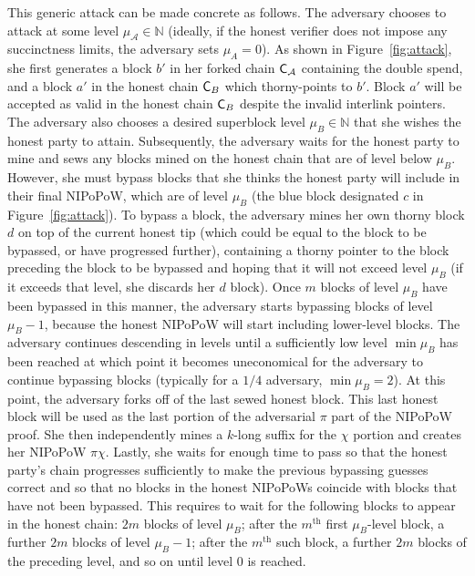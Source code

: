 This generic attack can be made concrete as follows.
The adversary chooses to attack at some level $\mu_\mathcal{A} \in \mathbb{N}$ (ideally, if the honest verifier does not impose any succinctness limits, the adversary sets $\mu_A = 0$). As shown in Figure~\ref{fig:attack}, she first generates a block $b'$ in her forked chain $\mathsf{C}_\mathcal{A}$ containing the double spend, and a block $a'$ in the honest chain $\mathsf{C}_B$ which thorny-points to $b'$. Block $a'$ will be accepted as valid in the honest chain $\mathsf{C}_B$ despite the invalid interlink pointers. The adversary also chooses a desired superblock level $\mu_B \in \mathbb{N}$ that she wishes the honest party to attain. Subsequently, the adversary waits for the honest party to mine and sews any blocks mined on the honest chain that are of level below $\mu_B$. However, she must bypass blocks that she thinks the honest party will include in their final NIPoPoW, which are of level $\mu_B$ (the blue block designated $c$ in Figure~\ref{fig:attack}). To bypass a block, the adversary mines her own thorny block $d$ on top of the current honest tip (which could be equal to the block to be bypassed, or have progressed further), containing a thorny pointer to the block preceding the block to be bypassed and hoping that it will not exceed level $\mu_B$ (if it exceeds that level, she discards her $d$ block). Once $m$ blocks of level $\mu_B$ have been bypassed in this manner, the adversary starts bypassing blocks of level $\mu_B - 1$, because the honest NIPoPoW will start including lower-level blocks. The adversary continues descending in levels until a sufficiently low level $\min\mu_B$ has been reached at which point it becomes uneconomical for the adversary to continue bypassing blocks (typically for a $1/4$ adversary, $\min\mu_B = 2$). At this point, the adversary forks off of the last sewed honest block. This last honest block will be used as the last portion of the adversarial $\pi$ part of the NIPoPoW proof. She then independently mines a $k$-long suffix for the $\chi$ portion and creates her NIPoPoW $\pi \chi$. Lastly, she waits for enough time to pass so that the honest party's chain progresses sufficiently to make the previous bypassing guesses correct and so that no blocks in the honest NIPoPoWs coincide with blocks that have not been bypassed. This requires to wait for the following blocks to appear in the honest chain: $2m$ blocks of level $\mu_B$; after the $m^\text{th}$ first $\mu_B$-level block, a further $2m$ blocks of level $\mu_B - 1$; after the $m^\text{th}$ such block, a further $2m$ blocks of the preceding level, and so on until level $0$ is reached.


